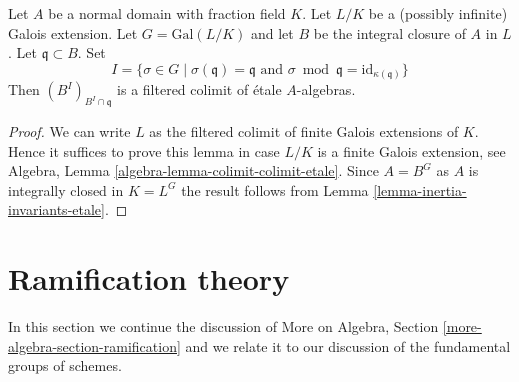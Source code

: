 \begin{lemma}
\label{lemma-inertial-invariants-unramified}
Let $A$ be a normal domain with fraction field $K$.
Let $L/K$ be a (possibly infinite) Galois extension.
Let $G = \text{Gal}(L/K)$ and let
$B$ be the integral closure of $A$ in $L$.
Let $\mathfrak q \subset B$. Set
$$
I = \{\sigma \in G \mid
\sigma(\mathfrak q) = \mathfrak q \text{ and }
\sigma \bmod \mathfrak q = \text{id}_{\kappa(\mathfrak q)}\}
$$
Then $(B^I)_{B^I \cap \mathfrak q}$ is a filtered colimit
of \'etale $A$-algebras.
\end{lemma}

\begin{proof}
We can write $L$ as the filtered colimit of finite Galois extensions
of $K$. Hence it suffices to prove this lemma in case $L/K$ is
a finite Galois extension, see
Algebra, Lemma \ref{algebra-lemma-colimit-colimit-etale}.
Since $A = B^G$ as $A$ is integrally
closed in $K = L^G$ the result follows from
Lemma \ref{lemma-inertia-invariants-etale}.
\end{proof}







\section{Ramification theory}
\label{section-ramification}

\noindent
In this section we continue the discussion of
More on Algebra, Section \ref{more-algebra-section-ramification}
and we relate it to our discussion of the fundamental groups of schemes.

